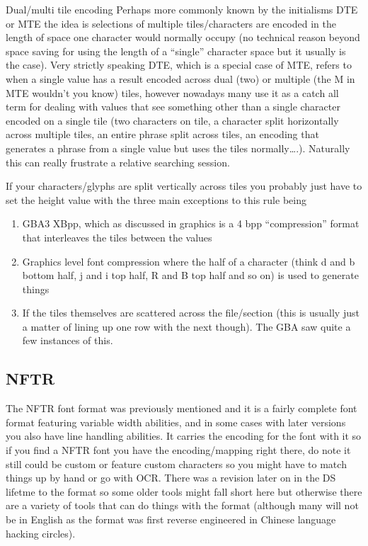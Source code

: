 \documentclass[
]{book}
\providecommand{\tightlist}{%
  \setlength{\itemsep}{0pt}\setlength{\parskip}{0pt}}
\begin{document}
Dual/multi tile encoding Perhaps more commonly known by the initialisms DTE or MTE the idea is selections of multiple tiles/characters are encoded in the length of space one character would normally occupy (no technical reason beyond space saving for using the length of a ``single'' character space but it usually is the case). Very strictly speaking DTE, which is a special case of MTE, refers to when a single value has a result encoded across dual (two) or multiple (the M in MTE wouldn't you know) tiles, however nowadays many use it as a catch all term for dealing with values that see something other than a single character encoded on a single tile (two characters on tile, a character split horizontally across multiple tiles, an entire phrase split across tiles, an encoding that generates a phrase from a single value but uses the tiles normally\ldots.). Naturally this can really frustrate a relative searching session.

If your characters/glyphs are split vertically across tiles you probably just have to set the height value with the three main exceptions to this rule being

\begin{enumerate}
\def\labelenumi{\arabic{enumi}.}
\tightlist
\item
  GBA3 XBpp, which as discussed in graphics is a 4 bpp ``compression'' format that interleaves the tiles between the values
\item
  Graphics level font compression where the half of a character (think d and b bottom half, j and i top half, R and B top half and so on) is used to generate things
\item
  If the tiles themselves are scattered across the file/section (this is usually just a matter of lining up one row with the next though). The GBA saw quite a few instances of this.
\end{enumerate}

\hypertarget{nftr}{%
\subsection{NFTR}\label{nftr}}

The NFTR font format was previously mentioned and it is a fairly complete font format featuring variable width abilities, and in some cases with later versions you also have line handling abilities. It carries the encoding for the font with it so if you find a NFTR font you have the encoding/mapping right there, do note it still could be custom or feature custom characters so you might have to match things up by hand or go with OCR. There was a revision later on in the DS lifetme to the format so some older tools might fall short here but otherwise there are a variety of tools that can do things with the format (although many will not be in English as the format was first reverse engineered in Chinese language hacking circles).
\end{document}
